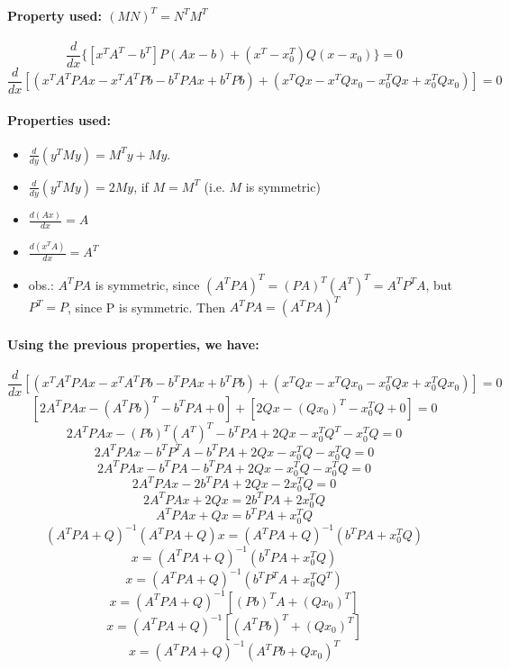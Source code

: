 \documentclass[a4paper]{article}    %
\begin{document}
\paragraph{Property used: $(MN)^T = N^T M^T$}
    \[\frac{d}{dx} \{[x^TA^T-b^T] P (Ax-b) + (x^T-x_0^T) Q (x-x_0)\} = 0\]
    \[\frac{d}{dx} [(x^TA^TPAx - x^TA^TPb -b^TPAx + b^TPb) + (x^TQx - x^TQx_0 - x_0^TQx + x_0^TQx_0)] = 0\]
\paragraph{Properties used:}
    \begin{itemize}
        \item $\frac{d}{dy}(y^TMy) = M^Ty + My$.
        \item $\frac{d}{dy}(y^TMy) = 2My$, if $M = M^T$ (i.e. $M$ is symmetric)
        \item $\frac{d(Ax)}{dx} = A$
        \item $\frac{d(x^TA)}{dx} = A^T$
        \item obs.: $A^TPA$ is symmetric, since $(A^TPA)^T = (PA)^T(A^T)^T = A^TP^TA$, but $P^T = P$, since P is symmetric. Then $A^TPA = (A^TPA)^T$
    \end{itemize}
\paragraph{Using the previous properties, we have:}
    \[\frac{d}{dx} [(x^TA^TPAx - x^TA^TPb -b^TPAx + b^TPb) + (x^TQx - x^TQx_0 - x_0^TQx + x_0^TQx_0)] = 0\]
    \[[2A^TPAx - (A^TPb)^T - b^TPA + 0] + [2Qx - (Qx_0)^T - x_0^TQ + 0] = 0\]
    \[2A^TPAx - (Pb)^T(A^T)^T - b^TPA + 2Qx - x_0^TQ^T - x_0^TQ = 0\]
    \[2A^TPAx - b^TP^TA - b^TPA + 2Qx - x_0^TQ - x_0^TQ = 0\]
    \[2A^TPAx - b^TPA - b^TPA + 2Qx - x_0^TQ - x_0^TQ = 0\]
    \[2A^TPAx - 2b^TPA + 2Qx - 2x_0^TQ = 0\]
    \[2A^TPAx + 2Qx = 2b^TPA + 2x_0^TQ\]
    \[A^TPAx + Qx = b^TPA + x_0^TQ\]
    \[(A^TPA + Q)^{-1}(A^TPA + Q)x = (A^TPA + Q)^{-1}(b^TPA + x_0^TQ)\]
    \[x = (A^TPA + Q)^{-1}(b^TPA + x_0^TQ)\]
    \[x = (A^TPA + Q)^{-1}(b^TP^TA + x_0^TQ^T)\]
    \[x = (A^TPA + Q)^{-1}[(Pb)^TA + (Qx_0)^T]\]
    \[x = (A^TPA + Q)^{-1}[(A^TPb)^T + (Qx_0)^T]\]
    \[\boxed{x = (A^TPA + Q)^{-1}(A^TPb + Qx_0)^T}\]
\newpage
\end{document}
